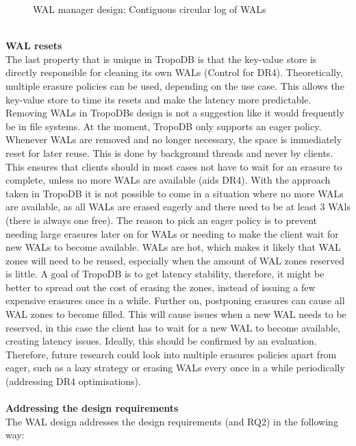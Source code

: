 \begin{figure}[h]
\centering
\begin{minipage}{0.75\textwidth}
  \centering
  
\end{minipage}%
\caption{ WAL manager design: Contiguous circular log of WALs}
\label{fig:wallog}
\end{figure} \\
\textbf{WAL resets}\\
The last property that is unique in TropoDB is that the key-value store is directly responsible for cleaning its own WALs (Control for DR4). Theoretically, multiple erasure policies can be used, depending on the use case. This allows the key-value store to time its resets and make the latency more predictable. Removing WALs in TropoDBs design is not a suggestion like it would frequently be in file systems.  At the moment, TropoDB only supports an eager policy. Whenever WALs are removed and no longer necessary, the space is immediately reset for later reuse. This is done by background threads and never by clients. This ensures that clients should in most cases not have to wait for an erasure to complete, unless no more WALs are available (aids DR4). With the approach taken in TropoDB it is not possible to come in a situation where no more WALs are available, as all WALs are erased eagerly and there need to be at least 3 WAls (there is always one free).  The reason to pick an eager policy is to prevent needing large erasures later on for WALs or needing to make the client wait for new WALs to become available. WALs are hot, which makes it likely that WAL zones will need to be reused, especially when the amount of WAL zones reserved is little. A goal of TropoDB is to get latency stability, therefore, it might be better to spread out the cost of erasing the zones, instead of issuing a few expensive erasures once in a while. Further on, postponing erasures can cause all WAL zones to become filled. This will cause issues when a new WAL needs to be reserved, in this case the client has to wait for a new WAL to become available, creating latency issues. Ideally, this should be confirmed by an evaluation. Therefore, future research could look into multiple erasures policies apart from eager, such as a lazy strategy or erasing WALs every once in a while periodically (addressing DR4 optimisations).\\\\
\textbf{Addressing the design requirements}\\
The WAL design addresses the design requirements (and RQ2) in the following way:
